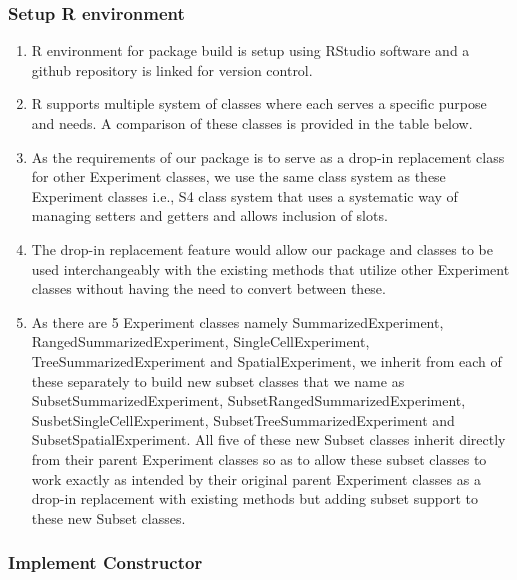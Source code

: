 \documentclass[
]{article}
\providecommand{\tightlist}{%
  \setlength{\itemsep}{0pt}\setlength{\parskip}{0pt}}
\begin{document}
\hypertarget{setup-r-environment}{%
\subsubsection{Setup R environment}\label{setup-r-environment}}

\begin{enumerate}
\def\labelenumi{\arabic{enumi}.}
\tightlist
\item
  R environment for package build is setup using RStudio software and a
  github repository is linked for version control.
\item
  R supports multiple system of classes where each serves a specific
  purpose and needs. A comparison of these classes is provided in the
  table below.
\item
  As the requirements of our package is to serve as a drop-in
  replacement class for other Experiment classes, we use the same class
  system as these Experiment classes i.e., S4 class system that uses a
  systematic way of managing setters and getters and allows inclusion of
  slots.
\item
  The drop-in replacement feature would allow our package and classes to
  be used interchangeably with the existing methods that utilize other
  Experiment classes without having the need to convert between these.
\item
  As there are 5 Experiment classes namely SummarizedExperiment,
  RangedSummarizedExperiment, SingleCellExperiment,
  TreeSummarizedExperiment and SpatialExperiment, we inherit from each
  of these separately to build new subset classes that we name as
  SubsetSummarizedExperiment, SubsetRangedSummarizedExperiment,
  SusbetSingleCellExperiment, SubsetTreeSummarizedExperiment and
  SubsetSpatialExperiment. All five of these new Subset classes inherit
  directly from their parent Experiment classes so as to allow these
  subset classes to work exactly as intended by their original parent
  Experiment classes as a drop-in replacement with existing methods but
  adding subset support to these new Subset classes.
\end{enumerate}

\hypertarget{implement-constructor}{%
\subsubsection{Implement Constructor}\label{implement-constructor}}
\end{document}
